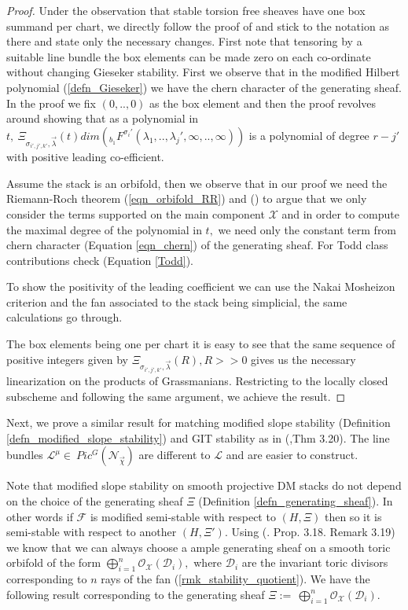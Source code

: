 \documentclass[10pt]{amsart}
\newcommand{\sX}{{\mathcal X}}
\numberwithin{equation}{subsection}
\begin{document}
\begin{proof}
Under the observation that stable torsion free sheaves have one box summand per chart, we directly follow the proof of \cite{Koo2} and stick to the notation as there and state only the necessary changes. First note that tensoring by a suitable line bundle the box elements can be made zero on each co-ordinate without changing Gieseker stability.
First we observe that in the modified Hilbert polynomial (\ref{defn_Gieseker}) we have the chern character of the generating sheaf. In the proof we fix $(0,..,0)$ as the box element and then the proof revolves around showing that as a polynomial in $t,\  \Xi_{\sigma_{i',j',k'},\vec\lambda}(t)dim(_{b_1}F^{\sigma_i'}(\lambda_1,..,\lambda_j',\infty,..,\infty))$ is a polynomial of degree $r-j'$ with positive leading co-efficient.\par
Assume the stack is an orbifold, then we observe that in our proof we need the Riemann-Roch theorem (\ref{eqn_orbifold_RR}) and (\cite{Edidin}) to argue that we only consider the terms supported on the main component $\sX$ and in order to compute the maximal degree of the polynomial in $t,$ we need only the constant term from chern character (Equation \ref{eqn_chern}) of the generating sheaf. For Todd class contributions check (Equation \ref{Todd}).\par
To show the positivity of the leading coefficient we can use the Nakai Mosheizon criterion and the fan associated to the stack being simplicial, the same calculations go through.\par
The box elements being one per chart it is easy to see that the same sequence of positive integers given by $\Xi_{\sigma_{i',j',k'},\vec\lambda}(R),R>>0$ gives us the necessary linearization on the products of Grassmanians. Restricting to the locally closed subscheme and following the same argument, we achieve the result.
\end{proof}
Next, we prove a similar result for matching modified slope stability (Definition \ref{defn_modified_slope_stability}) and GIT stability as in (\cite{Koo2},Thm 3.20). The line bundles $\mathscr{L}^\mu\in \ Pic^{G}(\mathscr{N}_{\vec\chi})$ are different to $\mathscr{L}$ and are easier to construct.\par
Note that modified slope stability on smooth projective DM stacks do not depend on the choice of the generating sheaf $\Xi$ (Definition \ref{defn_generating_sheaf}). In other words if $\mathscr{F}$ is modified semi-stable with respect to $(H,\Xi)$ then so it is semi-stable with respect to another $(H,\Xi').$ Using (\cite{Nir}. Prop. 3.18. Remark 3.19) we know that we can always choose a ample generating sheaf on a smooth toric orbifold of the form $\bigoplus_{i=1}^{n}\mathscr{O}_{\sX}(\mathscr{D}_i),$ where $\mathscr{D}_i$ are the invariant toric divisors corresponding to $n$ rays of the fan (\ref{rmk_stability_quotient}). We have the following result corresponding to the generating sheaf $\Xi:=\ \bigoplus_{i=1}^{n}\mathscr{O}_{\sX}(\mathscr{D}_i)$.
\end{document}
